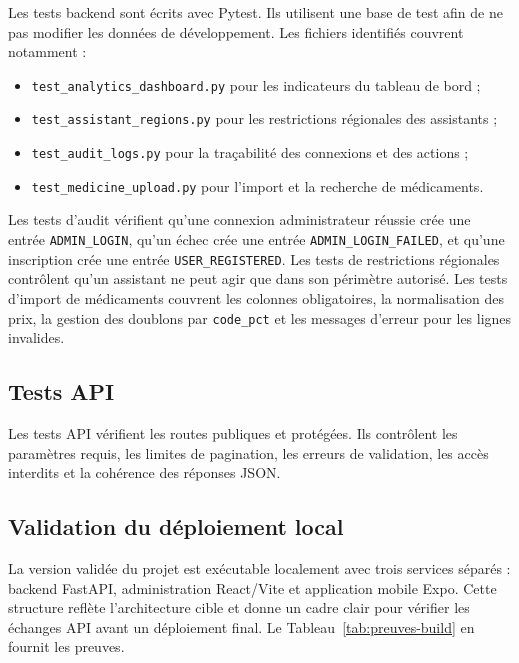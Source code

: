 Les tests backend sont écrits avec Pytest. Ils utilisent une base de test afin de ne pas modifier les
données de développement. Les fichiers identifiés couvrent notamment :

\begin{itemize}
    \item \texttt{test\_analytics\_dashboard.py} pour les indicateurs du tableau de bord ;
    \item \texttt{test\_assistant\_regions.py} pour les restrictions régionales des assistants ;
    \item \texttt{test\_audit\_logs.py} pour la traçabilité des connexions et des actions ;
    \item \texttt{test\_medicine\_upload.py} pour l'import et la recherche de médicaments.
\end{itemize}

Les tests d'audit vérifient qu'une connexion administrateur réussie crée une entrée
\texttt{ADMIN\_LOGIN}, qu'un échec crée une entrée \texttt{ADMIN\_LOGIN\_FAILED}, et qu'une inscription crée
une entrée \texttt{USER\_REGISTERED}. Les tests de restrictions régionales contrôlent qu'un assistant ne
peut agir que dans son périmètre autorisé. Les tests d'import de médicaments couvrent les colonnes
obligatoires, la normalisation des prix, la gestion des doublons par \texttt{code\_pct} et les messages
d'erreur pour les lignes invalides.

\subsection{Tests API}

Les tests API vérifient les routes publiques et protégées. Ils contrôlent les paramètres requis, les
limites de pagination, les erreurs de validation, les accès interdits et la cohérence des réponses JSON.

\subsection{Validation du déploiement local}

La version validée du projet est exécutable localement avec trois services séparés : backend FastAPI,
administration React/Vite et application mobile Expo. Cette structure reflète l'architecture cible et
donne un cadre clair pour vérifier les échanges API avant un déploiement final. Le
Tableau~\ref{tab:preuves-build} en fournit les preuves.

